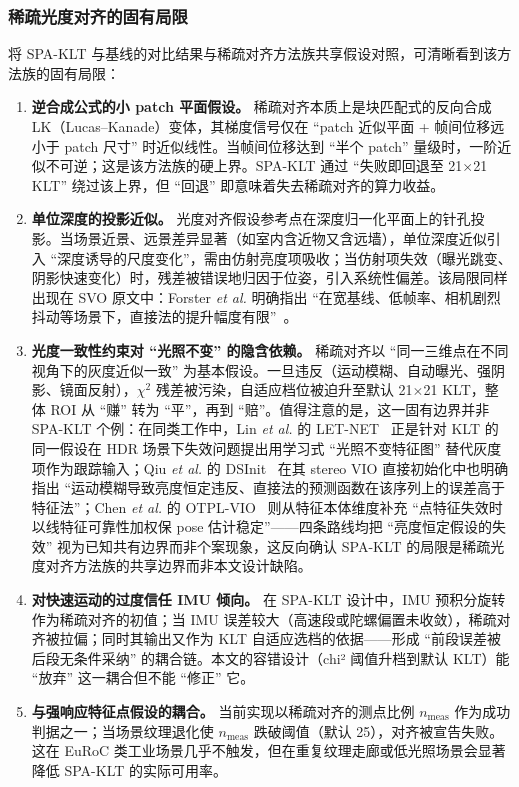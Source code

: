 \documentclass[letterpaper,journal]{IEEEtran}
\begin{document}
\subsubsection{稀疏光度对齐的固有局限}

将 SPA-KLT 与基线的对比结果与稀疏对齐方法族共享假设对照，可清晰看到该方法族的固有局限：

\begin{enumerate}
\item \textbf{逆合成公式的小 patch 平面假设。} 稀疏对齐本质上是块匹配式的反向合成 LK（Lucas--Kanade）变体，其梯度信号仅在 ``patch 近似平面 + 帧间位移远小于 patch 尺寸'' 时近似线性。当帧间位移达到 ``半个 patch'' 量级时，一阶近似不可逆；这是该方法族的硬上界。SPA-KLT 通过 ``失败即回退至 21$\times$21 KLT'' 绕过该上界，但 ``回退'' 即意味着失去稀疏对齐的算力收益。
\item \textbf{单位深度的投影近似。} 光度对齐假设参考点在深度归一化平面上的针孔投影。当场景近景、远景差异显著（如室内含近物又含远墙），单位深度近似引入 ``深度诱导的尺度变化''，需由仿射亮度项吸收；当仿射项失效（曝光跳变、阴影快速变化）时，残差被错误地归因于位姿，引入系统性偏差。该局限同样出现在 SVO 原文中：Forster \textit{et al.} 明确指出 ``在宽基线、低帧率、相机剧烈抖动等场景下，直接法的提升幅度有限''~\cite{forster2017svo}。
\item \textbf{光度一致性约束对 ``光照不变'' 的隐含依赖。} 稀疏对齐以 ``同一三维点在不同视角下的灰度近似一致'' 为基本假设。一旦违反（运动模糊、自动曝光、强阴影、镜面反射），$\chi^2$ 残差被污染，自适应档位被迫升至默认 21$\times$21 KLT，整体 ROI 从 ``赚'' 转为 ``平''，再到 ``赔''。值得注意的是，这一固有边界并非 SPA-KLT 个例：在同类工作中，Lin \emph{et al.} 的 LET-NET~\cite{lin2024letnet} 正是针对 KLT 的同一假设在 HDR 场景下失效问题提出用学习式 ``光照不变特征图'' 替代灰度项作为跟踪输入；Qiu \emph{et al.} 的 DSInit~\cite{qiu2026dsinit} 在其 stereo VIO 直接初始化中也明确指出 ``运动模糊导致亮度恒定违反、直接法的预测函数在该序列上的误差高于特征法''；Chen \emph{et al.} 的 OTPL-VIO~\cite{chen2026otpl} 则从特征本体维度补充 ``点特征失效时以线特征可靠性加权保 pose 估计稳定''——四条路线均把 ``亮度恒定假设的失效'' 视为已知共有边界而非个案现象，这反向确认 SPA-KLT 的局限是稀疏光度对齐方法族的共享边界而非本文设计缺陷。
\item \textbf{对快速运动的过度信任 IMU 倾向。} 在 SPA-KLT 设计中，IMU 预积分旋转作为稀疏对齐的初值；当 IMU 误差较大（高速段或陀螺偏置未收敛），稀疏对齐被拉偏；同时其输出又作为 KLT 自适应选档的依据——形成 ``前段误差被后段无条件采纳'' 的耦合链。本文的容错设计（chi² 阈值升档到默认 KLT）能 ``放弃'' 这一耦合但不能 ``修正'' 它。
\item \textbf{与强响应特征点假设的耦合。} 当前实现以稀疏对齐的测点比例 $n_{\mathrm{meas}}$ 作为成功判据之一；当场景纹理退化使 $n_{\mathrm{meas}}$ 跌破阈值（默认 25），对齐被宣告失败。这在 EuRoC 类工业场景几乎不触发，但在重复纹理走廊或低光照场景会显著降低 SPA-KLT 的实际可用率。
\end{enumerate}
\end{document}
